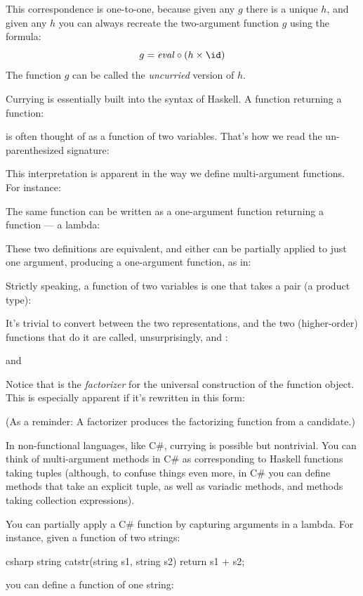 This correspondence is one-to-one, because given any $g$ there is
a unique $h$, and given any $h$ you can always recreate
the two-argument function $g$ using the formula:
\[g = \mathit{eval} \circ (h \times \id)\]
The function $g$ can be called the \emph{uncurried} version of $h$.

Currying is essentially built into the syntax of Haskell. A function
returning a function:

is often thought of as a function of two variables. That's how we read
the un-parenthesized signature:

This interpretation is apparent in the way we define multi-argument
functions. For instance:

The same function can be written as a one-argument function returning a
function --- a lambda:

These two definitions are equivalent, and either can be partially
applied to just one argument, producing a one-argument function, as in:

Strictly speaking, a function of two variables is one that takes a pair
(a product type):

It's trivial to convert between the two representations, and the two
(higher-order) functions that do it are called, unsurprisingly,
 and :

and

Notice that  is the \emph{factorizer} for the universal
construction of the function object. This is especially apparent if it's
rewritten in this form:

(As a reminder: A factorizer produces the factorizing function from a
candidate.)

In non-functional languages, like C\#, currying is possible but
nontrivial. You can think of multi-argument methods in C\# as
corresponding to Haskell functions taking tuples (although, to confuse
things even more, in C\# you can define methods that take an explicit
tuple, as well as  variadic methods, and methods taking
collection expressions).

You can partially apply a C\# function by capturing arguments in a
lambda. For instance, given a function of two strings:

\begin{snip}{csharp}
string catstr(string s1, string s2) {
    return s1 + s2;
}
\end{snip}
you can define a function of one string:

